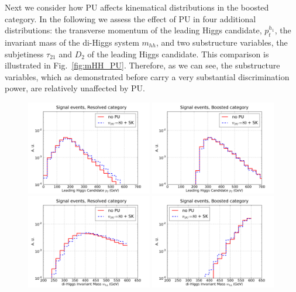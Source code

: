 Next we consider how PU affects kinematical distributions
in the boosted category.
%
In the following we assess the effect of PU in four additional
distributions: the transverse momentum of the leading Higgs
candidate, $p_t^{h_1}$, the invariant mass of the di-Higgs system
$m_{hh}$, and two substructure variables, the subjetiness
$\tau_{21}$ and $D_2$ of the leading Higgs candidate.
%
This comparison is illustrated in Fig.~\ref{fig:mHH_PU}.
%
Therefore, as we can see, the substructure variables, which
as demonstrated before carry a very substantial
discrimination power, are relatively unaffected by PU.

\begin{figure}[t]
  \begin{center}
    \vspace{-1cm}
  \includegraphics[width=0.49\textwidth]{plots/pt_H0_C2_res_comp.pdf}
  \includegraphics[width=0.49\textwidth]{plots/pt_H0_C2_bst_comp.pdf}
  \includegraphics[width=0.49\textwidth]{plots/m_HH_C2_res_comp.pdf}
  \includegraphics[width=0.49\textwidth]{plots/m_HH_C2_bst_comp.pdf}

\end{center}
\end{figure}
